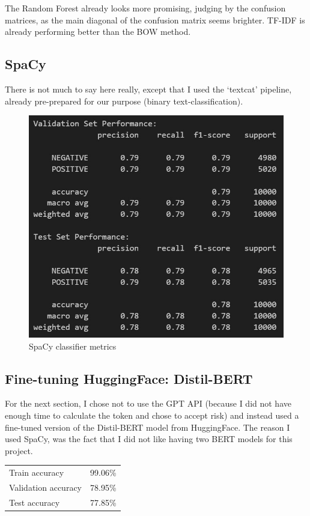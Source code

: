 \documentclass[12pt]{article}
\begin{document}
The Random Forest already looks more promising, judging by the confusion matrices, 
as the main diagonal of the confusion matrix seems brighter. TF-IDF
is already performing better than the BOW method.

\pagebreak

\subsection{SpaCy}
There is not much to say here really, except that I used the `textcat'
pipeline, already pre-prepared for our purpose (binary text-classification).

\begin{figure}[h!]
    \centering
    \includegraphics[width=.6\textwidth]{P2.SpaCy.jpg}
    \caption{SpaCy classifier metrics}
    \label{fig:P2.SpaCy}
\end{figure}

\subsection{Fine-tuning HuggingFace: Distil-BERT}

For the next section, I chose not to use the GPT API (because I did not
have enough time to calculate the token and chose to accept risk)
and instead used a fine-tuned version of the Distil-BERT model from 
HuggingFace. The reason I used SpaCy, was the fact that I did not like
having two BERT models for this project.

\begin{tabular}{lr}
    Train accuracy & 99.06\%\\
    Validation accuracy & 78.95\%\\
    Test accuracy & 77.85\%\\
\end{tabular}

\makeendpage
\end{document}
